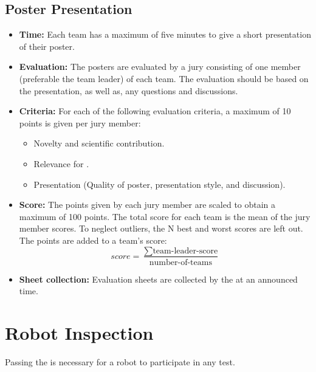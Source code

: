 \subsection*{Poster Presentation}
\label{sec:setupdays:posterpresentation}
\begin{itemize}
	\item \textbf{Time:} Each team has a maximum of five minutes to give a short presentation of their poster.
	\item \textbf{Evaluation:} The posters are evaluated by a jury consisting of one member (preferable the team leader) of each team. The evaluation should be based on the presentation, as well as, any questions and discussions.
	\item \textbf{Criteria:} For each of the following evaluation criteria, a maximum of 10 points is given per jury member:
	\begin{itemize}
		\item Novelty and scientific contribution.
		\item Relevance for \RoboCup\AtHome{}.
		\item Presentation (Quality of poster, presentation style, and discussion).
	\end{itemize}
	\item \textbf{Score:} The points given by each jury member are scaled to obtain a maximum of 100 points. The total score for each team is the mean of the jury member scores. To neglect outliers, the N best and worst scores are left out. The points are added to a team's \SONE{} score:
	$$
	score=\frac{\sum \text{team-leader-score}}{\text{number-of-teams}}
	$$
	\item \textbf{Sheet collection:} Evaluation sheets are collected by the \OC{} at an announced time.
\end{itemize}

\section{Robot Inspection}
\label{sec:setupdays:inspection}
Passing the \RobotInspection{} is necessary for a robot to participate in any test.

